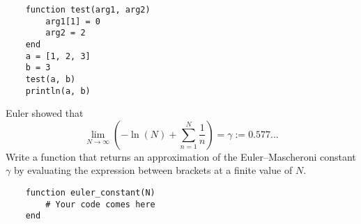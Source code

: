 \begin{verbatim}
    function test(arg1, arg2)
        arg1[1] = 0
        arg2 = 2
    end
    a = [1, 2, 3]
    b = 3
    test(a, b)
    println(a, b)
\end{verbatim}


\begin{task}
    Euler showed that
    \[
        \lim_{N \to \infty} \left( - \ln(N) + \sum_{n=1}^{N} \frac{1}{n} \right) = \gamma := 0.577...
    \]
    Write a function that returns an approximation of the Euler--Mascheroni constant $\gamma$ by evaluating the expression between brackets at a finite value of $N$.
    \begin{verbatim}
    function euler_constant(N)
        # Your code comes here
    end
    \end{verbatim}
\end{task}

